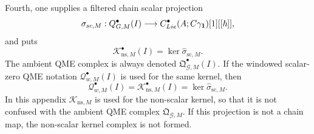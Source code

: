 \begin{defn}
  Fourth, one supplies a filtered chain scalar projection
  \[
    \sigma_{sc,M}:
    Q^\bullet_{G,M}(I)
      \longrightarrow
    C^\bullet_{Lie}(A;C\gamma_{\mathbf 1})[1][[\hbar]],
  \]
  and puts
  \[
    \mathcal K^\bullet_{\mathrm{ns},M}(I)
      =
    \ker\widehat\sigma_{\mathrm{sc},M}.
  \]
  The ambient QME complex is always denoted
  \(\mathfrak Q^\bullet_{\mathcal G,M}(I)\).  If the windowed
  scalar-zero QME notation
  \(\mathcal Q^\bullet_{w,M}(I)\) is used for the same kernel, then
  \[
    \mathcal Q^\bullet_{w,M}(I)
      =
    \mathcal K^\bullet_{\mathrm{ns},M}(I)
      =
    \ker\widehat\sigma_{\mathrm{sc},M}.
  \]
  In this appendix \(\mathcal K_{\mathrm{ns},M}\) is used for the
  non-scalar kernel, so that it is not confused with the ambient QME
  complex \(\mathfrak Q_{\mathcal G,M}\).
  If this projection is not a chain map, the non-scalar kernel complex is
  not formed.
\end{defn}

